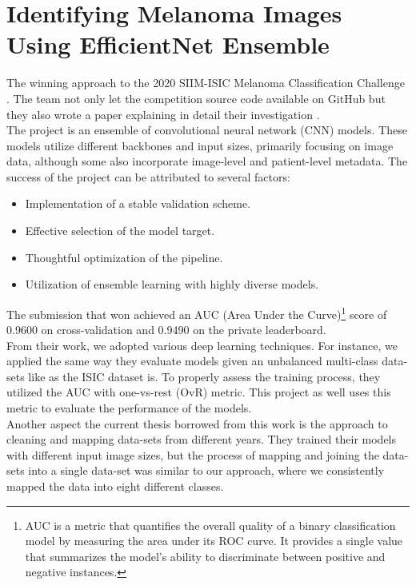 \section{Identifying Melanoma Images Using EfficientNet Ensemble}

The winning approach to the 2020 SIIM-ISIC Melanoma Classification Challenge
\cite{ISICKaggle}. The team not only let the competition source code available
on GitHub \cite{WinningISICGithub} but they also wrote a paper explaining in
detail their investigation \cite{WinningISIC}. \\

The project is an ensemble of convolutional neural network (CNN) models. These
models utilize different backbones and input sizes, primarily focusing on image
data, although some also incorporate image-level and patient-level metadata.
The success of the project can be attributed to several factors:

\begin{itemize}
  \item Implementation of a stable validation scheme.
  \item Effective selection of the model target.
  \item Thoughtful optimization of the pipeline.
  \item Utilization of ensemble learning with highly diverse models.
\end{itemize}

The submission that won achieved an AUC (Area Under the Curve)\footnote{AUC is
a metric that quantifies the overall quality of a binary classification model
by measuring the area under its ROC curve. It provides a single value that
summarizes the model's ability to discriminate between positive and negative
instances.} score of 0.9600 on cross-validation and 0.9490 on the private
leaderboard. \\

From their work, we adopted various deep learning techniques. For instance, we
applied the same way they evaluate models given an unbalanced multi-class
data-sets like as the ISIC dataset is. To properly assess the training process,
they utilized the AUC with one-vs-rest (OvR) metric. This project as well uses
this metric to evaluate the performance of the models. \\

Another aspect the current thesis borrowed from this work is the approach to
cleaning and mapping data-sets from different years. They trained their models
with different input image sizes, but the process of mapping and joining the
data-sets into a single data-set was similar to our approach, where we
consistently mapped the data into eight different classes. \\


